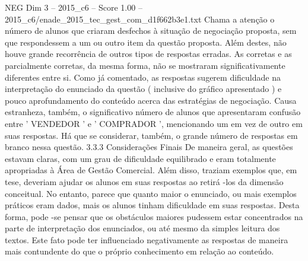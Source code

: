 \begin{textsample}{NEG Dim 3 – 2015\_c6 – Score 1.00 – 2015\_c6/enade\_2015\_tec\_gest\_com\_d1f662b3e1.txt}
Chama a atenção o número de alunos que criaram desfechos à situação de negociação proposta, sem que respondessem a um ou outro item da questão proposta.
Além destes, não houve grande recorrência de outros tipos de respostas erradas.
As corretas e as parcialmente corretas, da mesma forma, não se mostraram significativamente diferentes entre si.
Como já comentado, as respostas sugerem dificuldade na interpretação do enunciado da questão ( inclusive do gráfico apresentado ) e pouco aprofundamento do conteúdo acerca das estratégias de negociação.
Causa estranheza, também, o significativo número de alunos que apresentaram confusão entre ' VENDEDOR ' e ' COMPRADOR ', mencionando um em vez de outro em suas respostas.
Há que se considerar, também, o grande número de respostas em branco nessa questão. 3.3.3 Considerações Finais De maneira geral, as questões estavam claras, com um grau de dificuldade equilibrado e eram totalmente apropriadas à Área de Gestão Comercial.
Além disso, traziam exemplos que, em tese, deveriam ajudar os alunos em suas respostas ao retirá -los da dimensão conceitual.
No entanto, parece que quanto maior o enunciado, ou mais exemplos práticos eram dados, mais os alunos tinham dificuldade em suas respostas.
Desta forma, pode -se pensar que os obstáculos maiores pudessem estar concentrados na parte de interpretação dos enunciados, ou até mesmo da simples leitura dos textos.
Este fato pode ter influenciado negativamente as respostas de maneira mais contundente do que o próprio conhecimento em relação ao conteúdo.

\end{textsample}
